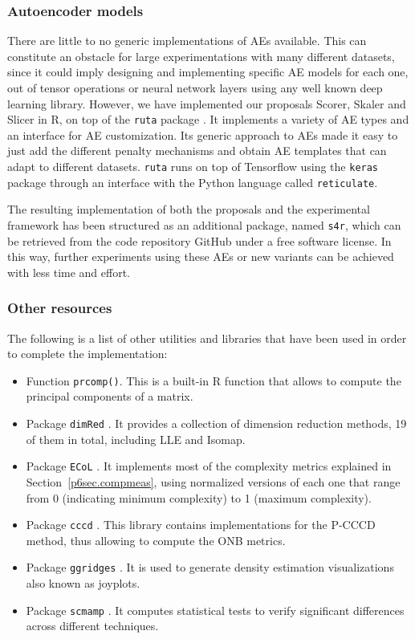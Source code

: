   \subsubsection{Autoencoder models}

  There are little to no generic implementations of AEs available. This can constitute an obstacle for large experimentations with many different datasets, since it could imply designing and implementing specific AE models for each one, out of tensor operations or neural network layers using any well known deep learning library. However, we have implemented our proposals Scorer, Skaler and Slicer in R, on top of the \texttt{ruta} package \cite{charte2019ruta}. It implements a variety of AE types and an interface for AE customization. Its generic approach to AEs made it easy to just add the different penalty mechanisms and obtain AE templates that can adapt to different datasets. \texttt{ruta} runs on top of Tensorflow using the \texttt{keras} package through an interface with the Python language called \texttt{reticulate}.

  The resulting implementation of both the proposals and the experimental framework has been structured as an additional package, named \texttt{s4r}, which can be retrieved from the code repository GitHub under a free software license. In this way, further experiments using these AEs or new variants can be achieved with less time and effort.

  \subsubsection{Other resources}

  The following is a list of other utilities and libraries that have been used in order to complete the implementation:

  \begin{itemize}
    \item Function \texttt{prcomp()}. This is a built-in R function that allows to compute the principal components of a matrix.
    \item Package \texttt{dimRed} \cite{dimred}. It provides a collection of dimension reduction methods, 19 of them in total, including LLE and Isomap.
    \item Package \texttt{ECoL} \cite{lorena2019complex}. It implements most of the complexity metrics explained in Section~\ref{p6sec.compmeas}, using normalized versions of each one that range from 0 (indicating minimum complexity) to 1 (maximum complexity).
    \item Package \texttt{cccd} \cite{cccd}. This library contains implementations for the P-CCCD method, thus allowing to compute the ONB metrics.
    \item Package \texttt{ggridges} \cite{ggridges}. It is used to generate density estimation visualizations also known as joyplots.
    \item Package \texttt{scmamp} \cite{scmamp}. It computes statistical tests to verify significant differences across different techniques.
  \end{itemize}
\fi

